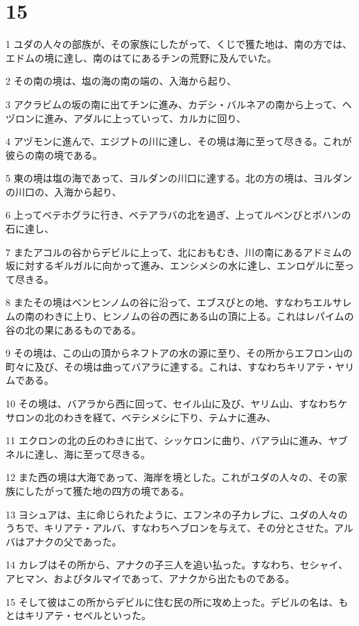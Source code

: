 \chapter{15}

\par 1 ユダの人々の部族が、その家族にしたがって、くじで獲た地は、南の方では、エドムの境に達し、南のはてにあるチンの荒野に及んでいた。
\par 2 その南の境は、塩の海の南の端の、入海から起り、
\par 3 アクラビムの坂の南に出てチンに進み、カデシ・バルネアの南から上って、ヘヅロンに進み、アダルに上っていって、カルカに回り、
\par 4 アヅモンに進んで、エジプトの川に達し、その境は海に至って尽きる。これが彼らの南の境である。
\par 5 東の境は塩の海であって、ヨルダンの川口に達する。北の方の境は、ヨルダンの川口の、入海から起り、
\par 6 上ってベテホグラに行き、ベテアラバの北を過ぎ、上ってルベンびとボハンの石に達し、
\par 7 またアコルの谷からデビルに上って、北におもむき、川の南にあるアドミムの坂に対するギルガルに向かって進み、エンシメシの水に達し、エンロゲルに至って尽きる。
\par 8 またその境はベンヒンノムの谷に沿って、エブスびとの地、すなわちエルサレムの南のわきに上り、ヒンノムの谷の西にある山の頂に上る。これはレパイムの谷の北の果にあるものである。
\par 9 その境は、この山の頂からネフトアの水の源に至り、その所からエフロン山の町々に及び、その境は曲ってバアラに達する。これは、すなわちキリアテ・ヤリムである。
\par 10 その境は、バアラから西に回って、セイル山に及び、ヤリム山、すなわちケサロンの北のわきを経て、ベテシメシに下り、テムナに進み、
\par 11 エクロンの北の丘のわきに出て、シッケロンに曲り、バアラ山に進み、ヤブネルに達し、海に至って尽きる。
\par 12 また西の境は大海であって、海岸を境とした。これがユダの人々の、その家族にしたがって獲た地の四方の境である。
\par 13 ヨシュアは、主に命じられたように、エフンネの子カレブに、ユダの人々のうちで、キリアテ・アルバ、すなわちヘブロンを与えて、その分とさせた。アルバはアナクの父であった。
\par 14 カレブはその所から、アナクの子三人を追い払った。すなわち、セシャイ、アヒマン、およびタルマイであって、アナクから出たものである。
\par 15 そして彼はこの所からデビルに住む民の所に攻め上った。デビルの名は、もとはキリアテ・セペルといった。
